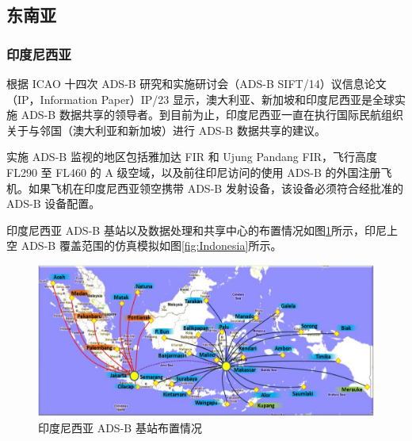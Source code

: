 \subsection{东南亚}

\subsubsection{印度尼西亚}

根据 ICAO 十四次 ADS-B 研究和实施研讨会（ADS-B SIFT/14）议信息论文（IP，Information Paper）IP/23 显示，澳大利亚、新加坡和印度尼西亚是全球实施 ADS-B 数据共享的领导者。到目前为止，印度尼西亚一直在执行国际民航组织关于与邻国（澳大利亚和新加坡）进行 ADS-B 数据共享的建议。

实施 ADS-B 监视的地区包括雅加达 FIR 和 Ujung Pandang FIR，飞行高度 FL290 至 FL460 的 A 级空域，以及前往印尼访问的使用 ADS-B 的外国注册飞机。如果飞机在印度尼西亚领空携带 ADS-B 发射设备，该设备必须符合经批准的 ADS-B 设备配置。

印度尼西亚 ADS-B 基站以及数据处理和共享中心的布置情况如图\ref{fig:Indonesia_integration}所示，印尼上空 ADS-B 覆盖范围的仿真模拟如图\ref{fig:Indonesia}所示。

\begin{figure}[!htb]
\centering
\includegraphics[width=14cm]{pic/Indonesia_integration.png}
\caption{印度尼西亚 ADS-B 基站布置情况\protect\footnotemark}
\label{fig:Indonesia_integration}
\end{figure}


